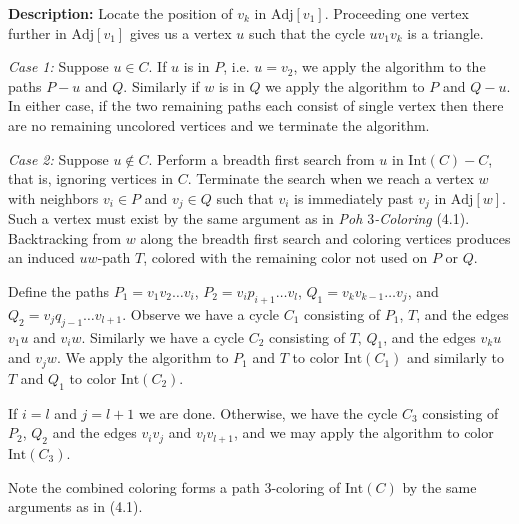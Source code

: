 \documentclass[letterpaper, 12pt]{article}
\theoremstyle{definition}
\theoremstyle{definition}
\theoremstyle{thm}
\theoremstyle{definition}
\begin{document}
\noindent\textbf{Description:} Locate the position of $v_k$ in
$\text{Adj}[v_1]$. Proceeding one vertex further in $\text{Adj}[v_1]$ gives us a
vertex $u$ such that the cycle $uv_1v_k$ is a triangle.

\textit{Case 1:} Suppose $u\in C$. If $u$ is in $P$, i.e. $u=v_2$, we apply the
algorithm to the paths $P-u$ and $Q$. Similarly if $w$ is in $Q$ we apply the
algorithm to $P$ and $Q-u$. In either case, if the two remaining paths each
consist of single vertex then there are no remaining uncolored vertices and we
terminate the algorithm.

\textit{Case 2:} Suppose $u\not\in C$. Perform a breadth first search from $u$
in $\text{Int}(C)-C$, that is, ignoring vertices in $C$. Terminate the search
when we reach a vertex
$w$ with neighbors $v_i\in P$ and $v_j \in Q$ such that $v_i$ is immediately
past $v_j$ in $\text{Adj}[w]$. Such a vertex must exist by the same argument
as in \textit{Poh $3$-Coloring} (4.1).
Backtracking from $w$ along the breadth first search and coloring vertices
produces an induced $uw$-path $T$, colored with the remaining color not used on
$P$ or $Q$.

Define the paths $P_1=v_1v_2\ldots v_i$, $P_2=v_ip_{i+1}\ldots v_l$,
$Q_1=v_kv_{k-1}\ldots v_j$, and $Q_2=v_jq_{j-1}\ldots v_{l+1}$. Observe we
have a cycle $C_1$ consisting of $P_1$, $T$, and the edges $v_1u$ and $v_iw$.
Similarly we have a cycle $C_2$ consisting of $T$, $Q_1$, and the edges $v_ku$
and $v_jw$. We apply the algorithm to $P_1$ and $T$ to color $\text{Int}(C_1)$
and similarly to $T$ and $Q_1$ to color $\text{Int}(C_2)$.

If $i=l$ and
$j=l+1$ we are done. Otherwise, we have the cycle $C_3$ consisting of $P_2$,
$Q_2$ and the edges $v_iv_j$ and $v_lv_{l+1}$, and we may apply the algorithm to
color $\text{Int}(C_3)$.

Note the combined coloring forms a path $3$-coloring of $\text{Int}(C)$ by the
same arguments as in (4.1).
\end{document}

